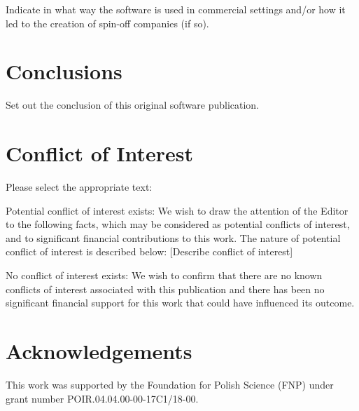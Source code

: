 \documentclass[preprint,12pt, a4paper]{elsarticle}
\newcommand{\1}{{\rm 1\hspace{-0.9mm}l}}
\begin{document}
Indicate in what way the software is used in commercial settings and/or how it 
led to the creation of spin-off companies (if so).

\section{Conclusions}
\label{}

Set out the conclusion of this original software publication.

\section{Conflict of Interest}
Please select the appropriate text:

Potential conflict of interest exists:
We wish to draw the attention of the Editor to the following facts, which may 
be considered as potential conflicts of interest, and to significant financial 
contributions to this work. The nature of potential conflict of interest is 
described below: [Describe conflict of interest]

No conflict of interest exists:
We wish to confirm that there are no known conflicts of interest associated 
with this publication and there has been no significant financial support for 
this work that could have influenced its outcome.


\section*{Acknowledgements}

This work was supported by the Foundation for Polish Science (FNP) under grant
number POIR.04.04.00-00-17C1/18-00.


 
\end{document}
